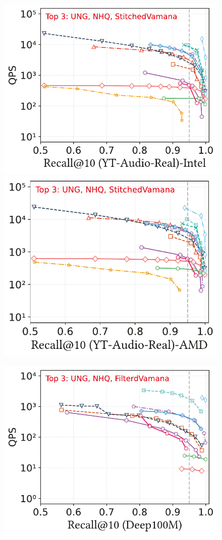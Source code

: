 \documentclass[sigconf, nonacm]{acmart}
\begin{document}
{\begin{figure}
\begin{minipage}[t]{0.38\textwidth}
	\end{minipage}%
	\hfill %
	\begin{minipage}[t]{0.39\textwidth}
		\centering
		\includegraphics[width=0.495\linewidth]{figures/exp/attribute_85.pdf}
		\hfill
		\includegraphics[width=0.47\linewidth]{figures/exp/attribute_71.pdf}
		
	\end{minipage}%
	\hfill
	\begin{minipage}[t]{0.203\textwidth}
		\centering
		\includegraphics[width=0.96\linewidth]{figures/exp/attribute_100M.pdf} 


\end{minipage}
\end{figure}}
\end{document}
